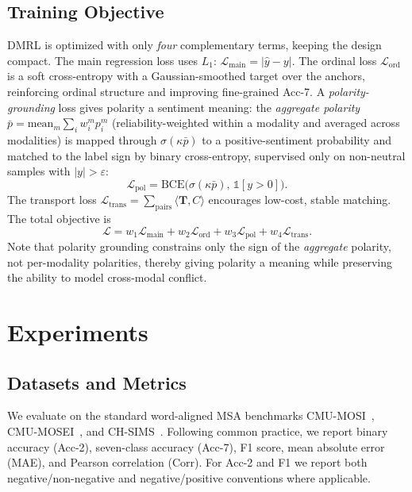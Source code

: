 \documentclass[conference]{IEEEtran}
\begin{document}
\subsection{Training Objective}
\label{sec:loss}
DMRL is optimized with only \emph{four} complementary terms, keeping the design
compact. The main regression loss uses $L_1$: $\mathcal{L}_{\text{main}} = |\hat{y}-y|$.
The ordinal loss $\mathcal{L}_{\text{ord}}$ is a soft cross-entropy with a
Gaussian-smoothed target over the anchors, reinforcing ordinal structure and
improving fine-grained Acc-7. A \emph{polarity-grounding} loss gives polarity a
sentiment meaning: the \emph{aggregate polarity}
$\bar p = \mathrm{mean}_m \sum_i w^m_i p^m_i$ (reliability-weighted within a modality
and averaged across modalities) is mapped through $\sigma(\kappa\bar p)$ to a
positive-sentiment probability and matched to the label sign by binary
cross-entropy, supervised only on non-neutral samples with $|y|>\varepsilon$:
\begin{equation}
\mathcal{L}_{\text{pol}} = \mathrm{BCE}\big(\sigma(\kappa\bar p),\, \mathbb{1}[y>0]\big).
\end{equation}
The transport loss $\mathcal{L}_{\text{trans}}=\sum_{\text{pairs}}\langle\mathbf{T},C\rangle$
encourages low-cost, stable matching. The total objective is
\begin{equation}
\mathcal{L} = w_1\mathcal{L}_{\text{main}} + w_2\mathcal{L}_{\text{ord}}
            + w_3\mathcal{L}_{\text{pol}} + w_4\mathcal{L}_{\text{trans}}.
\end{equation}
Note that polarity grounding constrains only the sign of the \emph{aggregate}
polarity, not per-modality polarities, thereby giving polarity a meaning while
preserving the ability to model cross-modal conflict.

\section{Experiments}

\subsection{Datasets and Metrics}
We evaluate on the standard word-aligned MSA benchmarks CMU-MOSI~\cite{zadeh2016mosi},
CMU-MOSEI~\cite{zadeh2018mosei}, and CH-SIMS~\cite{yu2020ch}. Following common
practice, we report binary accuracy (Acc-2), seven-class accuracy (Acc-7),
F1 score, mean absolute error (MAE), and Pearson correlation (Corr). For Acc-2 and
F1 we report both negative/non-negative and negative/positive conventions where
applicable.
\end{document}
